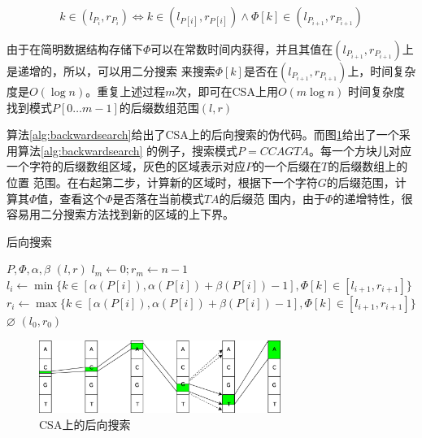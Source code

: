 \documentclass[UTF8,adobefonts]{ctexart}
\begin{document}
\begin{equation}\label{equa:equa1}
    k \in (l_{P_i},r_{P_i}) \iff k \in (l_{P[i]},r_{P[i]}) \wedge \Phi[k] \in (l_{P_{i+1}},r_{P_{i+1}})
\end{equation}

由于在简明数据结构存储下$\Phi$可以在常数时间内获得，并且其值在$(l_{P_{i+1}},r_{P_{i+1}})$上是递增的，所以，可以用二分搜索
来搜索$\Phi[k]$是否在$(l_{P_{i+1}},r_{P_{i+1}})$上，时间复杂度是$O(\log n)$。重复上述过程$m$次，即可在CSA上用$O(m\log n)$
时间复杂度找到模式$P[0\ldots m-1]$的后缀数组范围$(l,r)$

算法\ref{alg:backwardsearch}给出了CSA上的后向搜索的伪代码。而图\ref{figbackwardsearch}给出了一个采用算法\ref{alg:backwardsearch}
的例子，搜索模式$P=CCAGTA$。每一个方块儿对应一个字符的后缀数组区域，灰色的区域表示对应$P$的一个后缀在$T$的后缀数组上的位置
范围。在右起第二步，计算新的区域时，根据下一个字符$G$的后缀范围，计算其$\Phi$值，查看这个$\Phi$是否落在当前模式$TA$的后缀范
围内，由于$\Phi$的递增特性，很容易用二分搜索方法找到新的区域的上下界。

\begin{algorithm}
    \caption{后向搜索}
    \label{alg:backwardsearch}
    \begin{algorithmic}[1]
        \Require $P,\Phi,\alpha,\beta$
        \Ensure $(l,r)$
        \State $l_{m} \gets 0;r_{m}\gets n-1$
            \State $l_i \gets \min\{ k \in [\alpha(P[i]),\alpha(P[i])+\beta(P[i])-1],\Phi[k] \in [l_{i+1},r_{i+1}]\}$
            \State $r_i \gets \max\{ k \in [\alpha(P[i]),\alpha(P[i])+\beta(P[i])-1],\Phi[k] \in [l_{i+1},r_{i+1}]\}$
                \State \Return $\varnothing$
            \EndIf
        \EndFor
        \State \Return $(l_0,r_0)$
        \EndFunction
    \end{algorithmic}
\end{algorithm}


\begin{figure}[t]
    \centering
    \includegraphics[width=0.7\textwidth]{csa_backwardsearch}
    \caption{CSA上的后向搜索}
    \label{figbackwardsearch}
\end{figure}
\end{document}
